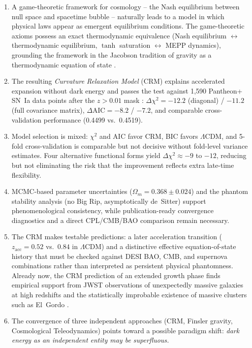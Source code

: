\documentclass[aps,prd,twocolumn,superscriptaddress,nofootinbib]{revtex4-2}
\begin{document}
\begin{enumerate}
\item A game-theoretic framework for cosmology -- the Nash equilibrium between null space and spacetime bubble -- naturally leads to a model in which physical laws appear as emergent equilibrium conditions. The game-theoretic axioms possess an exact thermodynamic equivalence (Nash equilibrium $\leftrightarrow$ thermodynamic equilibrium, $\tanh$ saturation $\leftrightarrow$ MEPP dynamics), grounding the framework in the Jacobson tradition of gravity as a thermodynamic equation of state \cite{Jacobson1995}.
\item The resulting \textit{Curvature Relaxation Model} (CRM) explains accelerated expansion without dark energy and passes the test against 1,590 Pantheon+ SN~Ia data points after the $z>0.01$ mask \cite{Scolnic2022}: $\Delta\chi^2 = -12.2$ (diagonal) / $-11.2$ (full covariance matrix), $\Delta\mathrm{AIC} = -8.2$ / $-7.2$, and comparable cross-validation performance (0.4499 vs.\ 0.4519).
\item Model selection is mixed: $\chi^2$ and AIC favor CRM, BIC favors $\Lambda$CDM, and 5-fold cross-validation is comparable but not decisive without fold-level variance estimates. Four alternative functional forms yield $\Delta\chi^2 \approx -9$ to $-12$, reducing but not eliminating the risk that the improvement reflects extra late-time flexibility.
\item MCMC-based parameter uncertainties ($\Omega_m = 0.368 \pm 0.024$) and the phantom stability analysis (no Big Rip, asymptotically de~Sitter) support phenomenological consistency, while publication-ready convergence diagnostics and a direct CPL/CMB/BAO comparison remain necessary.
\item The CRM makes testable predictions: a later acceleration transition ($z_{\mathrm{acc}} = 0.52$ vs.\ $0.84$ in $\Lambda$CDM) and a distinctive effective equation-of-state history that must be checked against DESI BAO, CMB, and supernova combinations rather than interpreted as persistent physical phantomness. Already now, the CRM prediction of an extended growth phase finds empirical support from JWST observations of unexpectedly massive galaxies at high redshifts \cite{Labbe2023, BoylanKolchin2023} and the statistically improbable existence of massive clusters such as El~Gordo \cite{Asencio2023}.
\item The convergence of three independent approaches (CRM, Finsler gravity, Cosmological Teleodynamics) points toward a possible paradigm shift: \textit{dark energy as an independent entity may be superfluous.}
\end{enumerate}
\end{document}

